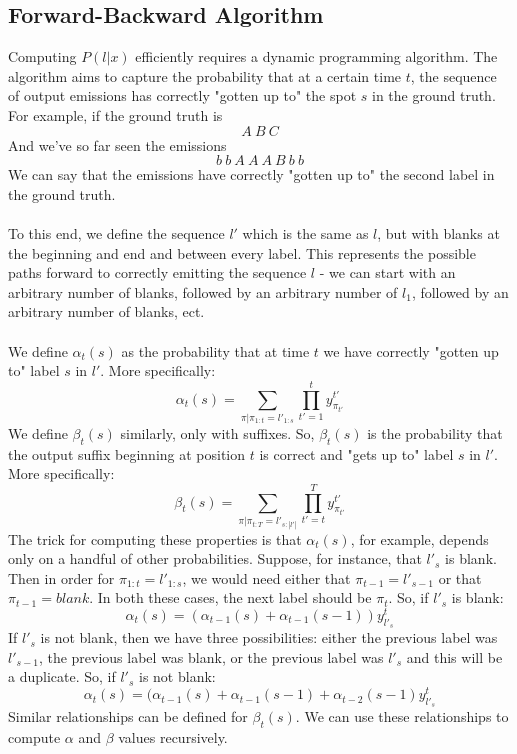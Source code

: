\documentclass[12pt]{article}
\begin{document}
\subsection{Forward-Backward Algorithm}
Computing $P(l|x)$ efficiently requires a dynamic programming algorithm.  The algorithm aims to capture the probability that at a certain time $t$, the sequence of output emissions has correctly "gotten up to" the spot $s$ in the ground truth.  For example, if the ground truth is 
\[A \ B \ C\]
And we've so far seen the emissions
\[b \ b \ A \ A \ A \ B \ b \ b\]
We can say that the emissions have correctly "gotten up to" the second label in the ground truth.
\\ \\
To this end, we define the sequence $l'$ which is the same as $l$, but with blanks at the beginning and end and between every label.  This represents the possible paths forward to correctly emitting the sequence $l$ - we can start with an arbitrary number of blanks, followed by an arbitrary number of $l_{1}$, followed by an arbitrary number of blanks, ect.
\\ \\
We define $\alpha_t(s)$ as the probability that at time $t$ we have correctly "gotten up to" label $s$ in $l'$.  More specifically:
 \[\alpha_t(s) = \sum_{\pi | \pi_{1:t} = l'_{1:s}} \prod_{t'=1}^t y^{t'}_{\pi_{t'}} \]
We define $\beta_t(s)$ similarly, only with suffixes.  So, $\beta_t(s)$ is the probability that the output suffix beginning at position $t$ is correct and "gets up to" label $s$ in $l'$.  More specifically:
\[\beta_t(s) = \sum_{\pi | \pi_{t:T} = l'_{s:|l'|}} \prod_{t'=t}^T y^{t'}_{\pi_{t'}}\]
The trick for computing these properties is that $\alpha_t(s)$, for example, depends only on a handful of other probabilities.  Suppose, for instance, that $l'_s$ is blank.  Then in order for $\pi_{1:t} = l'_{1:s}$, we would need either that $\pi_{t-1} = l'_{s-1}$ or that $\pi_{t-1} = blank$.  In both these cases, the next label should be $\pi_t$.  So, if $l'_s$ is blank:
\[\alpha_{t}(s) = (\alpha_{t-1}(s) + \alpha_{t-1}(s-1)) y^t_{l'_s}\]
If $l'_s$ is not blank, then we have three possibilities: either the previous label was $l'_{s-1}$, the previous label was blank, or the previous label was $l'_{s}$ and this will be a duplicate.  So, if $l'_s$ is not blank:
\[\alpha_{t}(s) =  (\alpha_{t-1}(s) + \alpha_{t-1}(s-1) + \alpha_{t-2}(s-1) y^t_{l'_s}\]
Similar relationships can be defined for $\beta_t(s)$.  We can use these relationships to compute $\alpha$ and $\beta$ values recursively.
\end{document}

